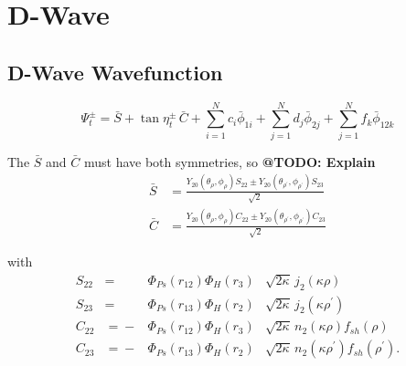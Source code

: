\documentclass[Dissertation.tex]{subfiles}
\begin{document}
\chapter{D-Wave}
\label{chp:DWave}


\section{D-Wave Wavefunction}

\begin{equation}
\Psi_t^\pm = \bar{S} + \tan \eta_t^\pm \, \bar{C} + \sum_{i=1}^N c_i \bar{\phi}_{1i} + \sum_{j=1}^N d_j \bar{\phi}_{2j} + \sum_{j=1}^N f_k \bar{\phi}_{12k}
\label{eq:DWaveSimple}
\end{equation}





\noindent The $\bar{S}$ and $\bar{C}$ must have both symmetries, so \textbf{@TODO: Explain}
\begin{subequations}
\label{eq:DWaveSandCBar}
\begin{align}
\bar{S} &= \frac{Y_{20}(\theta_\rho,\phi_\rho)S_{22} \pm Y_{20}(\theta_{\rho^\prime},\phi_{\rho^\prime})S_{23} }{\sqrt{2}} \label{eq:DWaveSBar} \\
\bar{C} &= \frac{Y_{20}(\theta_\rho,\phi_\rho)C_{22} \pm Y_{20}(\theta_{\rho^\prime},\phi_{\rho^\prime})C_{23} }{\sqrt{2}} \label{eq:DWaveCBar} 
\end{align}
\end{subequations}

\noindent with
\begin{subequations}
\label{eq:DWaveSandC}
\begin{alignat}{2}
S_{22} &={}&\Phi_{Ps}\left(r_{12}\right) \Phi_H\left(r_3\right) &\sqrt{2\kappa} \,j_2\!\left(\kappa\rho\right) \label{eq:DWaveS22Def} \\
S_{23} &={}&\Phi_{Ps}\left(r_{13}\right) \Phi_H\left(r_2\right) &\sqrt{2\kappa} \,j_2\!\left(\kappa\rho^\prime\right) \label{eq:DWaveS23Def} \\
C_{22} &={}-&\Phi_{Ps}\left(r_{12}\right) \Phi_H\left(r_3\right) &\sqrt{2\kappa} \,n_2\!\left(\kappa\rho\right) f_{sh}(\rho) \label{eq:DWaveC22Def} \\
C_{23} &={}-&\Phi_{Ps}\left(r_{13}\right) \Phi_H\left(r_2\right) &\sqrt{2\kappa} \,n_2\!\left(\kappa\rho^\prime\right) f_{sh}(\rho^\prime). \label{eq:DWaveC23Def}
\end{alignat}
\end{subequations}
\end{document}
